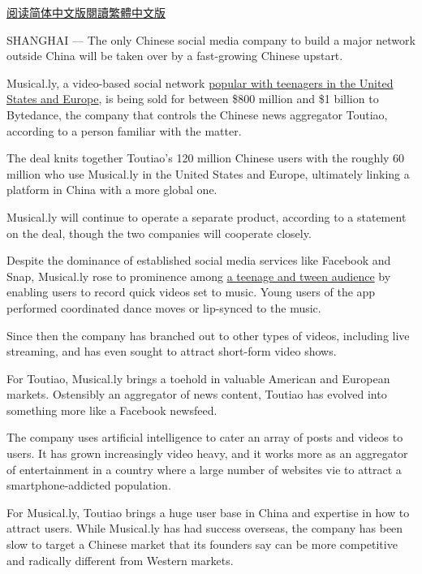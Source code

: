 \href{https://cn.nytimes.com/business/20171113/musically-sold-app-video/}{阅读简体中文版}\href{https://cn.nytimes.com/business/20171113/musically-sold-app-video/zh-hant/}{閱讀繁體中文版}

SHANGHAI --- The only Chinese social media company to build a major
network outside China will be taken over by a fast-growing Chinese
upstart.

Musical.ly, a video-based social network
\href{https://www.nytimes.com/2016/08/10/technology/china-homegrown-internet-companies-rest-of-the-world.html}{popular
with teenagers in the United States and Europe}, is being sold for
between \$800 million and \$1 billion to Bytedance, the company that
controls the Chinese news aggregator Toutiao, according to a person
familiar with the matter.

The deal knits together Toutiao's 120 million Chinese users with the
roughly 60 million who use Musical.ly in the United States and Europe,
ultimately linking a platform in China with a more global one.

Musical.ly will continue to operate a separate product, according to a
statement on the deal, though the two companies will cooperate closely.

Despite the dominance of established social media services like Facebook
and Snap, Musical.ly rose to prominence among
\href{https://www.nytimes.com/2016/09/17/business/media/a-social-network-frequented-by-children-tests-the-limits-of-online-regulation.html}{a
teenage and tween audience} by enabling users to record quick videos set
to music. Young users of the app performed coordinated dance moves or
lip-synced to the music.

Since then the company has branched out to other types of videos,
including live streaming, and has even sought to attract short-form
video shows.

For Toutiao, Musical.ly brings a toehold in valuable American and
European markets. Ostensibly an aggregator of news content, Toutiao has
evolved into something more like a Facebook newsfeed.

The company uses artificial intelligence to cater an array of posts and
videos to users. It has grown increasingly video heavy, and it works
more as an aggregator of entertainment in a country where a large number
of websites vie to attract a smartphone-addicted population.

For Musical.ly, Toutiao brings a huge user base in China and expertise
in how to attract users. While Musical.ly has had success overseas, the
company has been slow to target a Chinese market that its founders say
can be more competitive and radically different from Western markets.

